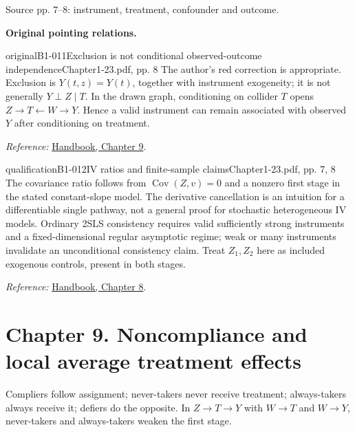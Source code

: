 {\begin{center}
\begin{tikzpicture}[>=Stealth, font=\small, line width=.65pt]
\end{tikzpicture}
\par{\small Source pp. 7--8: instrument, treatment, confounder and outcome.}
\end{center}
\par{}\smallskip\textbf{Original pointing relations.}\par\smallskip
{}
\begin{reviewnote}{original}{B1-011}{Exclusion is not conditional observed-outcome independence}{Chapter1-23.pdf, pp. 8}
The author's red correction is appropriate. Exclusion is $Y(t,z)=Y(t)$, together with instrument exogeneity; it is not generally $Y\perp Z\mid T$. In the drawn graph, conditioning on collider $T$ opens $Z\to T\leftarrow W\to Y$. Hence a valid instrument can remain associated with observed $Y$ after conditioning on treatment.
\par\smallskip\textit{Reference:} \href{https://matheusfacure.github.io/python-causality-handbook/09-Non-Compliance-and-LATE.html}{Handbook, Chapter 9}.
\end{reviewnote}

\begin{reviewnote}{qualification}{B1-012}{IV ratios and finite-sample claims}{Chapter1-23.pdf, pp. 7, 8}
The covariance ratio follows from $\operatorname{Cov}(Z,v)=0$ and a nonzero first stage in the stated constant-slope model. The derivative cancellation is an intuition for a differentiable single pathway, not a general proof for stochastic heterogeneous IV models. Ordinary 2SLS consistency requires valid sufficiently strong instruments and a fixed-dimensional regular asymptotic regime; weak or many instruments invalidate an unconditional consistency claim. Treat $Z_1,Z_2$ here as included exogenous controls, present in both stages.
\par\smallskip\textit{Reference:} \href{https://matheusfacure.github.io/python-causality-handbook/08-Instrumental-Variables.html}{Handbook, Chapter 8}.
\end{reviewnote}
\section{Chapter 9. Noncompliance and local average treatment effects}
Compliers follow assignment; never-takers never receive treatment; always-takers always receive it; defiers do the opposite. In $Z\to T\to Y$ with $W\to T$ and $W\to Y$, never-takers and always-takers weaken the first stage. 

}
